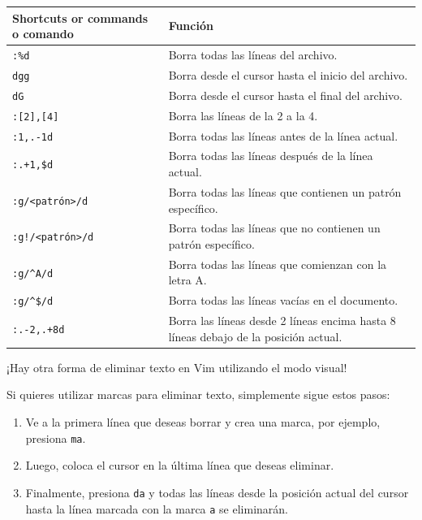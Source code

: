 \documentclass[
  doc,
  floatsintext,
  longtable,
  a4paper,
  nolmodern,
  notxfonts,
  notimes,
  12pt,
  colorlinks=true,linkcolor=blue,citecolor=blue,urlcolor=blue]{apa7}
\providecommand{\tightlist}{%
  \setlength{\itemsep}{0pt}\setlength{\parskip}{0pt}}
\newcounter{none} %
\begin{document}
{\def\LTcaptype{none} %
\begin{longtable}[]{@{}
  >{\raggedright\arraybackslash}p{}
  >{\raggedright\arraybackslash}p{}@{}}
\toprule\noalign{}
\begin{minipage}[b]{\linewidth}\raggedright
Shortcuts or commands o comando
\end{minipage} & \begin{minipage}[b]{\linewidth}\raggedright
Función
\end{minipage} \\
\midrule\noalign{}
\endhead
\bottomrule\noalign{}
\endlastfoot
\texttt{:\%d} & Borra todas las líneas del archivo. \\
\texttt{dgg} & Borra desde el cursor hasta el inicio del archivo. \\
\texttt{dG} & Borra desde el cursor hasta el final del archivo. \\
\texttt{:{[}2{]},{[}4{]}} & Borra las líneas de la 2 a la 4. \\
\texttt{:1,.-1d} & Borra todas las líneas antes de la línea actual. \\
\texttt{:.+1,\$d} & Borra todas las líneas después de la línea
actual. \\
\texttt{:g/\textless{}patrón\textgreater{}/d} & Borra todas las líneas
que contienen un patrón específico. \\
\texttt{:g!/\textless{}patrón\textgreater{}/d} & Borra todas las líneas
que no contienen un patrón específico. \\
\texttt{:g/\^{}A/d} & Borra todas las líneas que comienzan con la letra
A. \\
\texttt{:g/\^{}\$/d} & Borra todas las líneas vacías en el documento. \\
\texttt{:.-2,.+8d} & Borra las líneas desde 2 líneas encima hasta 8
líneas debajo de la posición actual. \\
\end{longtable}
}

¡Hay otra forma de eliminar texto en Vim utilizando el modo visual!

Si quieres utilizar marcas para eliminar texto, simplemente sigue estos
pasos:

\begin{enumerate}
\def\labelenumi{\arabic{enumi}.}
\tightlist
\item
  Ve a la primera línea que deseas borrar y crea una marca, por ejemplo,
  presiona \texttt{ma}.
\item
  Luego, coloca el cursor en la última línea que deseas eliminar.
\item
  Finalmente, presiona \texttt{d\textquotesingle{}a} y todas las líneas
  desde la posición actual del cursor hasta la línea marcada con la
  marca \texttt{a} se eliminarán.
\end{enumerate}
\end{document}
